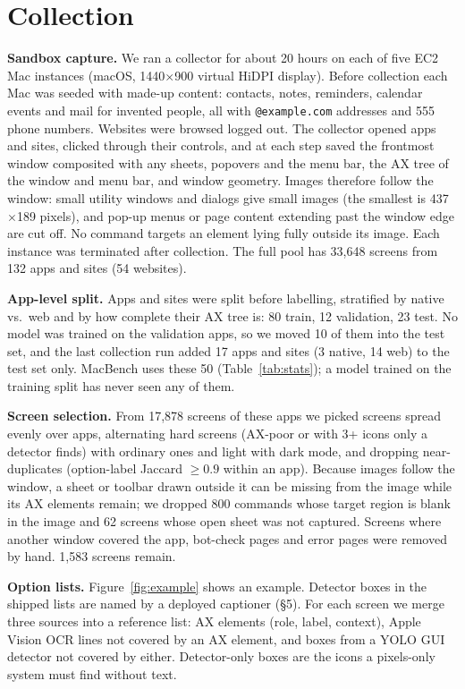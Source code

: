 \documentclass[sigconf,screen,review]{acmart}
\newcommand{\bench}{MacBench}
\begin{document}
\section{Collection}
\textbf{Sandbox capture.} We ran a collector for about 20 hours on each of five EC2 Mac instances (macOS, 1440$\times$900 virtual HiDPI display). Before collection each Mac was seeded with made-up content: contacts, notes, reminders, calendar events and mail for invented people, all with \texttt{@example.com} addresses and 555 phone numbers. Websites were browsed logged out. The collector opened apps and sites, clicked through their controls, and at each step saved the frontmost window composited with any sheets, popovers and the menu bar, the AX tree of the window and menu bar, and window geometry. Images therefore follow the window: small utility windows and dialogs give small images (the smallest is 437$\times$189 pixels), and pop-up menus or page content extending past the window edge are cut off. No command targets an element lying fully outside its image. Each instance was terminated after collection. The full pool has 33,648 screens from 132 apps and sites (54 websites).

\textbf{App-level split.} Apps and sites were split before labelling, stratified by native vs.\ web and by how complete their AX tree is: 80 train, 12 validation, 23 test. No model was trained on the validation apps, so we moved 10 of them into the test set, and the last collection run added 17 apps and sites (3 native, 14 web) to the test set only. \bench{} uses these 50 (Table~\ref{tab:stats}); a model trained on the training split has never seen any of them.

\textbf{Screen selection.} From 17,878 screens of these apps we picked screens spread evenly over apps, alternating hard screens (AX-poor or with 3+ icons only a detector finds) with ordinary ones and light with dark mode, and dropping near-duplicates (option-label Jaccard $\geq 0.9$ within an app). Because images follow the window, a sheet or toolbar drawn outside it can be missing from the image while its AX elements remain; we dropped 800 commands whose target region is blank in the image and 62 screens whose open sheet was not captured. Screens where another window covered the app, bot-check pages and error pages were removed by hand. 1,583 screens remain.

\textbf{Option lists.} Figure~\ref{fig:example} shows an example. Detector boxes in the shipped lists are named by a deployed captioner (\S5). For each screen we merge three sources into a reference list: AX elements (role, label, context), Apple Vision OCR lines not covered by an AX element, and boxes from a YOLO GUI detector not covered by either. Detector-only boxes are the icons a pixels-only system must find without text.
\end{document}
